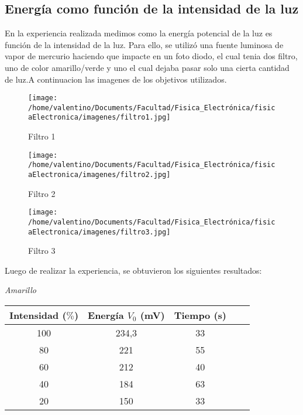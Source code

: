 \documentclass[a4paper]{article}
\begin{document}
      \subsection{Energía como función de la intensidad de la luz}
        \indent En la experiencia realizada medimos como la energía potencial de la luz es función de la intensidad de la luz. Para ello, se utilizó una fuente luminosa de vapor de mercurio haciendo que impacte en un foto diodo, el cual tenia dos filtro, uno de color amarillo/verde y uno el cual dejaba pasar solo una cierta cantidad de luz.A continuacion las imagenes de los objetivos utilizados.
        \vspace{0mm}

          \begin{figure}[h]
            \centering
            \texttt{[image: /home/valentino/Documents/Facultad/Fisica\_Electrónica/fisicaElectronica/imagenes/filtro1.jpg]}
            \caption{Filtro 1}
          \end{figure}

          \begin{figure}[h]       
            \centering
              \texttt{[image: /home/valentino/Documents/Facultad/Fisica\_Electrónica/fisicaElectronica/imagenes/filtro2.jpg]}
              \caption{Filtro 2}
        \end{figure}
          
        \begin{figure}[h]
                \centering
                \texttt{[image: /home/valentino/Documents/Facultad/Fisica\_Electrónica/fisicaElectronica/imagenes/filtro3.jpg]}
                \caption{Filtro 3}
        \end{figure}
        \vspace{5mm}

        
        \indent Luego de realizar la experiencia, se obtuvieron los siguientes resultados:
        \vspace{0mm}

        \begin{minipage}[c]{7.5cm}
          \vspace{5mm}
          \centering
          \textit{Amarillo} 
          \vspace{2mm}
        \end{minipage}

        \begin{tabular}{ c c c c c }
            \toprule
            Intensidad ($\%$) & Energía $V_{0}$ (mV) & Tiempo (s) \\
              \midrule
              100 & 234,3 & 33\\
              80 & 221 & 55\\
              60 & 212 & 40\\
              40 & 184 & 63\\
              20 & 150 & 33\\
            \bottomrule
          \end{tabular}
      
\end{document}
